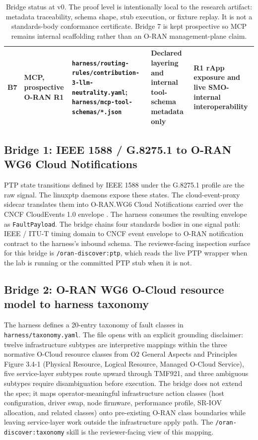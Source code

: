 \documentclass[twocolumn,10pt,a4paper]{article}
\begin{document}
\begin{table}[t]
\begin{tabularx}{\textwidth}{p{0.75cm}p{2.2cm}X p{2.5cm}X}
B7 & MCP, prospective O-RAN R1 & \texttt{harness/routing-rules/contribution-3-llm-neutrality.yaml}; \texttt{harness/mcp-tool-schemas/*.json} & Declared layering and internal tool-schema metadata only & R1 rApp exposure and live SMO-internal interoperability \\
\bottomrule
\end{tabularx}
\caption{Bridge status at v0. The proof level is intentionally local to the research artifact: metadata traceability, schema shape, stub execution, or fixture replay. It is not a standards-body conformance certificate. Bridge 7 is kept prospective so MCP remains internal scaffolding rather than an O-RAN management-plane claim.}
\label{tab:bridge-status}
\end{table}

\subsection{Bridge 1: IEEE 1588 / G.8275.1 to O-RAN WG6 Cloud Notifications}

PTP state transitions defined by IEEE 1588 \cite{ieee_1588_2019} under the G.8275.1 profile \cite{itu_g82751} are the raw signal. The linuxptp daemons \cite{linuxptp_ptp4l} expose these states. The cloud-event-proxy sidecar \cite{cloud_event_proxy} translates them into O-RAN.WG6 Cloud Notifications \cite{oran_cloud_notifications} carried over the CNCF CloudEvents 1.0 envelope \cite{cncf_cloudevents}. The harness consumes the resulting envelope as \texttt{FaultPayload}. The bridge chains four standards bodies in one signal path: IEEE / ITU-T timing domain to CNCF event envelope to O-RAN notification contract to the harness's inbound schema. The reviewer-facing inspection surface for this bridge is \texttt{/oran-discover:ptp}, which reads the live PTP wrapper when the lab is running or the committed PTP stub when it is not.

\subsection{Bridge 2: O-RAN WG6 O-Cloud resource model to harness taxonomy}

The harness defines a 20-entry taxonomy of fault classes in \texttt{harness/taxonomy.yaml}. The file opens with an explicit grounding disclaimer: twelve infrastructure subtypes are interpretive mappings within the three normative O-Cloud resource classes from O2 General Aspects and Principles Figure 3.4-1 \cite{oran_o2_ganp} (Physical Resource, Logical Resource, Managed O-Cloud Service), five service-layer subtypes route upward through TMF921, and three ambiguous subtypes require disambiguation before execution. The bridge does not extend the spec; it maps operator-meaningful infrastructure action classes (host configuration, driver swap, node firmware, performance profile, SR-IOV allocation, and related classes) onto pre-existing O-RAN class boundaries while leaving service-layer work outside the infrastructure apply path. The \texttt{/oran-discover:taxonomy} skill is the reviewer-facing view of this mapping.
\end{document}
